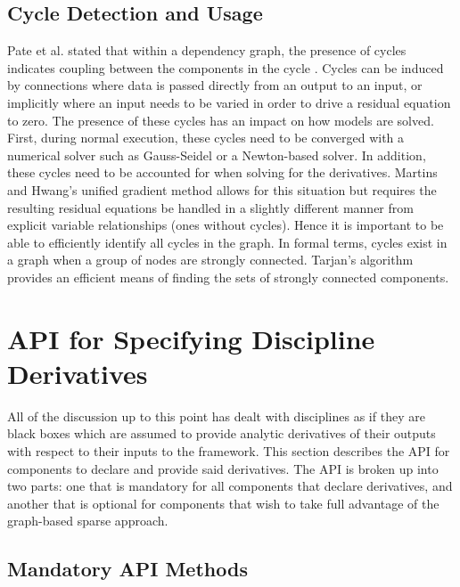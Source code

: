 \documentclass[]{aiaa-tc} %
\begin{document}
    \subsection{Cycle Detection and Usage}
        Pate et al. stated that within a dependency graph, the presence of cycles indicates coupling between
        the components in the cycle \cite{graph_problem2013}. Cycles can be induced by connections
        where data is passed directly from an output to an input, or implicitly where an input needs to
        be varied in order to drive a residual equation to zero. The presence of these cycles has
        an impact on how models are solved. First, during normal execution, these cycles
        need to be converged with a numerical solver such as Gauss-Seidel or a Newton-based solver.
        In addition, these cycles need to be accounted for when solving for the derivatives. Martins and Hwang's
        unified gradient method allows for this situation but requires the resulting residual equations be
        handled in a slightly different manner from explicit variable relationships (ones without cycles). Hence
        it is important to be able to efficiently identify all cycles in the graph. In formal terms,
        cycles exist in a graph when a group of nodes are strongly connected. Tarjan's algorithm provides
        an efficient means of finding the sets of strongly connected components\cite{tarjan1972depth,nuutila1994finding}.


    \section{API for Specifying Discipline Derivatives}

        All of the discussion up to this point has dealt with disciplines as if they are black boxes
        which are assumed to provide analytic derivatives of their outputs with respect to their inputs
        to the framework. This section describes the API for components to declare and provide
        said derivatives. The API is broken up into two parts: one that is mandatory for all components
        that declare derivatives, and another that is optional for components that wish to take full
        advantage of the graph-based sparse approach.

        \subsection{Mandatory API Methods}
\end{document}
